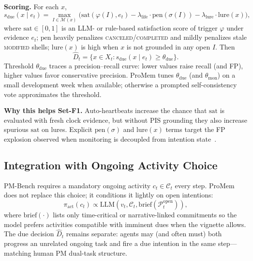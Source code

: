 \noindent\textbf{Scoring.}
For each $x$,
\begin{equation}
\label{eq:due-score}
s_{\mathrm{due}}(x\mid e_t)=
\max_{I\in\mathcal{M}(x)}
\Big(
\mathrm{sat}(\varphi(I),e_t)
-
\lambda_{\mathrm{life}}\cdot\mathrm{pen}(\sigma(I))
-
\lambda_{\mathrm{lure}}\cdot\mathrm{lure}(x)
\Big),
\end{equation}
where $\mathrm{sat}\in[0,1]$ is an LLM- or rule-based satisfaction score of trigger $\varphi$ under evidence $e_t$; $\mathrm{pen}$ heavily penalizes \textsc{canceled}/\textsc{completed} and mildly penalizes stale \textsc{modified} shells; $\mathrm{lure}(x)$ is high when $x$ is not grounded in any open $I$. Then
\begin{equation}
\hat{D}_t=\{x\in X_t:s_{\mathrm{due}}(x\mid e_t)\ge\theta_{\mathrm{due}}\}.
\end{equation}
Threshold $\theta_{\mathrm{due}}$ traces a precision--recall curve: lower values raise recall (and FP), higher values favor conservative precision. ProMem tunes $\theta_{\mathrm{due}}$ (and $\theta_{\mathrm{mon}}$) on a small development week when available; otherwise a prompted self-consistency vote approximates the threshold.

\noindent\textbf{Why this helps Set-F1.}
Auto-heartbeats increase the chance that $\mathrm{sat}$ is evaluated with fresh clock evidence, but without PIS grounding they also increase spurious $\mathrm{sat}$ on lures. Explicit $\mathrm{pen}(\sigma)$ and $\mathrm{lure}(x)$ terms target the FP explosion observed when monitoring is decoupled from intention state~\cite{pmbench2026}.

\subsection{Integration with Ongoing Activity Choice}
\label{sec:integrate}

PM-Bench requires a mandatory ongoing activity $c_t\in\mathcal{C}_t$ every step. ProMem does not replace this choice; it conditions it lightly on open intentions:
\begin{equation}
\pi_{\mathrm{act}}(c_t)\propto \mathrm{LLM}(v_t,\mathcal{C}_t,\mathrm{brief}(\mathcal{P}_t^{\mathrm{open}})),
\end{equation}
where $\mathrm{brief}(\cdot)$ lists only time-critical or narrative-linked commitments so the model prefers activities compatible with imminent dues when the vignette allows. The due decision $\hat{D}_t$ remains separate: agents may (and often must) both progress an unrelated ongoing task and fire a due intention in the same step---matching human PM dual-task structure.


